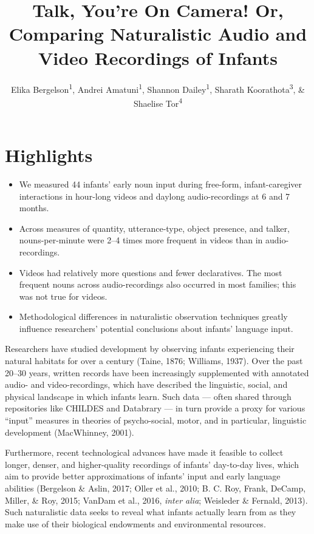\documentclass[floatsintext,man]{apa6}
\title{Talk, You're On Camera! Or, Comparing Naturalistic Audio and Video
Recordings of Infants}
\author{Elika Bergelson\textsuperscript{1}, Andrei Amatuni\textsuperscript{1}, Shannon Dailey\textsuperscript{1}, Sharath Koorathota\textsuperscript{3}, \& Shaelise Tor\textsuperscript{4}}
\affiliation{
    \vspace{0.5cm}
          \textsuperscript{1} Duke University\\
          \textsuperscript{2} University of Rochester\\
          \textsuperscript{3} Columbia University Medical Center\\
          \textsuperscript{4} Syracuse University  }
\providecommand{\tightlist}{%
  \setlength{\itemsep}{0pt}\setlength{\parskip}{0pt}}
\theoremstyle{definition}
\theoremstyle{definition}
\theoremstyle{definition}
\theoremstyle{remark}
\begin{document}
\maketitle

\setcounter{secnumdepth}{0}



\hypertarget{highlights}{%
\section{Highlights}\label{highlights}}

\begin{itemize}
\tightlist
\item
  We measured 44 infants' early noun input during free-form,
  infant-caregiver interactions in hour-long videos and daylong
  audio-recordings at 6 and 7 months.
\item
  Across measures of quantity, utterance-type, object presence, and
  talker, nouns-per-minute were 2--4 times more frequent in videos than
  in audio-recordings.
\item
  Videos had relatively more questions and fewer declaratives. The most
  frequent nouns across audio-recordings also occurred in most families;
  this was not true for videos.
\item
  Methodological differences in naturalistic observation techniques
  greatly influence researchers' potential conclusions about infants'
  language input.
\end{itemize}

Researchers have studied development by observing infants experiencing
their natural habitats for over a century (Taine, 1876; Williams, 1937).
Over the past 20--30 years, written records have been increasingly
supplemented with annotated audio- and video-recordings, which have
described the linguistic, social, and physical landscape in which
infants learn. Such data --- often shared through repositories like
CHILDES and Databrary --- in turn provide a proxy for various
\enquote{input} measures in theories of psycho-social, motor, and in
particular, linguistic development (MacWhinney, 2001).

Furthermore, recent technological advances have made it feasible to
collect longer, denser, and higher-quality recordings of infants'
day-to-day lives, which aim to provide better approximations of infants'
input and early language abilities (Bergelson \& Aslin, 2017; Oller et
al., 2010; B. C. Roy, Frank, DeCamp, Miller, \& Roy, 2015; VanDam et
al., 2016, \emph{inter alia}; Weisleder \& Fernald, 2013). Such
naturalistic data seeks to reveal what infants actually learn from as
they make use of their biological endowments and environmental
resources.
\end{document}
